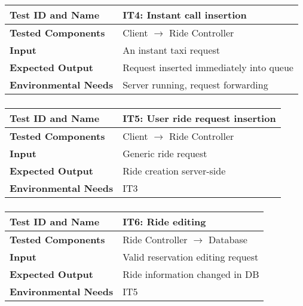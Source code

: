 \subsubsection{}

\begin{tabular}{l p{}}
    \hline
    \textbf{Test ID and Name} & \textbf{IT4: Instant call insertion}\\
    \hline
    \textbf{Tested Components} & Client $\rightarrow$ Ride Controller\\
    \hline
    \textbf{Input} & An instant taxi request\\
    \hline
    \textbf{Expected Output} & Request inserted immediately into queue\\
    \hline
    \textbf{Environmental Needs} & Server running, request forwarding\\
    \hline
\end{tabular}

\subsubsection{}

\begin{tabular}{l p{}}
    \hline
    \textbf{Test ID and Name} & \textbf{IT5: User ride request insertion}\\
    \hline
    \textbf{Tested Components} & Client $\rightarrow$ Ride Controller\\
    \hline
    \textbf{Input} & Generic ride request\\
    \hline
    \textbf{Expected Output} & Ride creation server-side\\
    \hline
    \textbf{Environmental Needs} & IT3\\
    \hline
\end{tabular}

\subsubsection{}

\begin{tabular}{l p{}}
    \hline
    \textbf{Test ID and Name} & \textbf{IT6: Ride editing}\\
    \hline
    \textbf{Tested Components} & Ride Controller $\rightarrow$ Database\\
    \hline
    \textbf{Input} & Valid reservation editing request\\
    \hline
    \textbf{Expected Output} & Ride information changed in DB\\
    \hline
    \textbf{Environmental Needs} & IT5\\
    \hline
\end{tabular}


